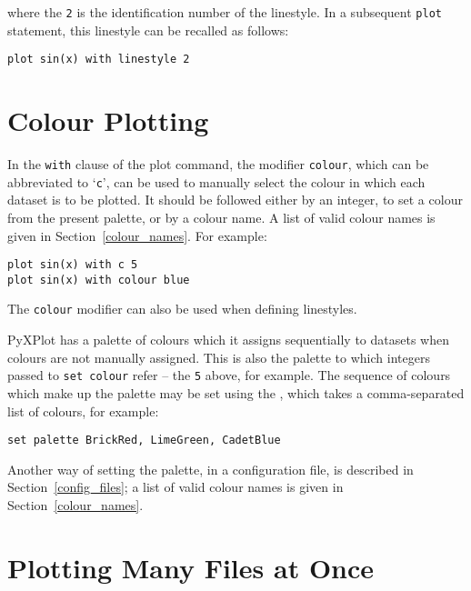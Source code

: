 \noindent where the {\tt 2} is the identification number of the linestyle. In a
subsequent {\tt plot} statement, this linestyle can be recalled as follows:

\begin{verbatim}
plot sin(x) with linestyle 2
\end{verbatim}

\section{Colour Plotting}

 In the {\tt with} clause of the plot
command, the modifier {\tt colour}, which can be abbreviated to
`{\tt c}', can be used to manually select the colour in which each dataset
is to be plotted. It should be followed either by an integer, to set a colour
from the present palette, or by a colour name. A list of valid colour names is
given in Section~\ref{colour_names}. For example:

\begin{verbatim}
plot sin(x) with c 5
plot sin(x) with colour blue
\end{verbatim}

\noindent The {\tt colour} modifier can also be used when defining linestyles.

 PyXPlot has a palette of
colours which it assigns sequentially to datasets when colours are not manually
assigned. This is also the palette to which integers passed to {\tt set colour}
refer -- the {\tt 5} above, for example. The sequence of colours which make up
the palette may be set using the , which takes a
comma-separated list of colours, for example:

\begin{verbatim}
set palette BrickRed, LimeGreen, CadetBlue
\end{verbatim}

\noindent Another way of setting the palette, in a configuration file, is
described in Section~\ref{config_files}; a list of valid colour names is given
in Section~\ref{colour_names}.

\section{Plotting Many Files at Once}


